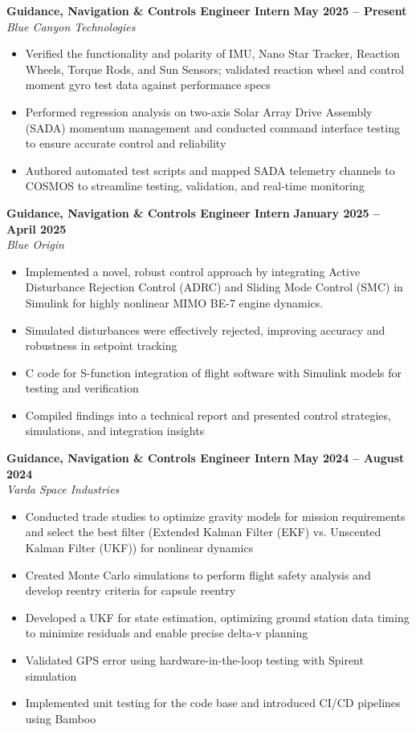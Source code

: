 \documentclass[10pt]{article}
\begin{document}
	\textbf{Guidance, Navigation \& Controls Engineer Intern} \hfill \textbf{May 2025 – Present} \\
	\emph{Blue Canyon Technologies}
	\begin{itemize}
		\item Verified the functionality and polarity of IMU, Nano Star Tracker, Reaction Wheels, Torque Rods, and Sun Sensors; validated reaction wheel and control moment gyro test data against performance specs
		\item Performed regression analysis on two-axis Solar Array Drive Assembly (SADA) momentum management and conducted command interface testing to ensure accurate control and reliability
		\item Authored automated test scripts and mapped SADA telemetry channels to COSMOS to streamline testing, validation, and real-time monitoring
	\end{itemize}


	\textbf{Guidance, Navigation \& Controls Engineer Intern} \hfill \textbf{January 2025 – April 2025} \\
	\emph{Blue Origin}
	\begin{itemize}
		\item Implemented a novel, robust control approach by integrating Active Disturbance Rejection Control (ADRC) and Sliding Mode Control (SMC) in Simulink for highly nonlinear MIMO BE-7 engine dynamics.
		\item Simulated disturbances were effectively rejected, improving accuracy and robustness in setpoint tracking
		\item C code for S-function integration of flight software with Simulink models for testing and verification
		\item Compiled findings into a technical report and presented control strategies, simulations, and integration insights
	\end{itemize}
	
	\textbf{Guidance, Navigation \& Controls Engineer Intern} \hfill \textbf{May 2024 – August 2024} \\
	\emph{Varda Space Industries}
	\begin{itemize}
		\item Conducted trade studies to optimize gravity models for mission requirements and select the best filter (Extended Kalman Filter (EKF) vs. Unscented Kalman Filter (UKF)) for nonlinear dynamics
		\item Created Monte Carlo simulations to perform flight safety analysis and develop reentry criteria for capsule reentry
		\item Developed a UKF for state estimation, optimizing ground station data timing to minimize residuals and enable precise delta-v planning
		\item Validated GPS error using hardware-in-the-loop testing with Spirent simulation
		\item Implemented unit testing for the code base and introduced CI/CD pipelines using Bamboo
	\end{itemize}
	
\end{document}
